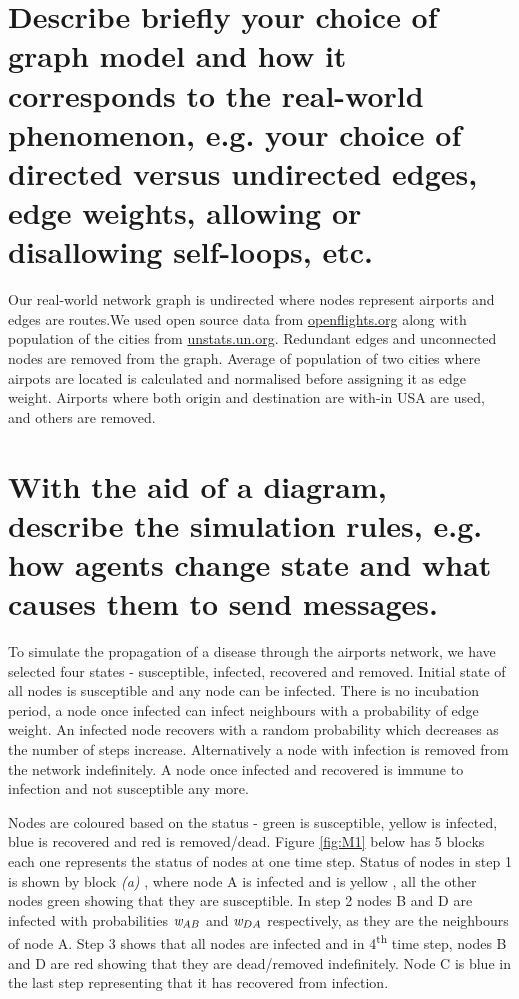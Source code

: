 \documentclass[a4paper,11pt]{article}
\begin{document}
\section{Describe briefly your choice of graph model and how it corresponds to the real-world phenomenon, e.g. your choice of directed versus undirected edges, edge weights, allowing or disallowing self-loops, etc.}

Our real-world network graph is undirected where nodes represent airports and edges are routes.We used open source data from \href{http://openflights.org}{openflights.org} along with population of the cities from \href{https://unstats.un.org/unsd/demographic/products/dyb/City_Page.htm}{unstats.un.org}. Redundant edges and unconnected nodes are removed from the graph. Average of population of two cities where airpots are located is calculated and normalised before assigning it as edge weight. Airports where both origin and destination are with-in USA are used, and others are removed.



\section{With the aid of a diagram, describe the simulation rules, e.g. how agents change state and what causes them to send messages.}



To simulate the propagation of a disease through the airports network, we have selected four states - susceptible, infected, recovered and  removed. Initial state of all nodes is susceptible and any node can be infected. There is no incubation period, a node once infected can infect neighbours with a probability of edge weight. An infected node recovers with a random probability which decreases as the number of steps increase. Alternatively a node with infection is removed from the network indefinitely. A node once infected and recovered is immune to infection and not susceptible any more.

Nodes are coloured based on the status - green is susceptible, yellow is infected, blue is recovered and red is removed/dead. Figure \ref{fig:M1} below has 5 blocks each one represents the status of nodes at one time step. Status of nodes in step 1 is shown by block \textit{(a)} , where node A is infected and is yellow , all the other nodes green showing that they are susceptible. In step 2 nodes B and D are infected with probabilities ${\emph{w} _{AB}}$  and ${\emph{w}_{DA}}$ respectively, as they are the neighbours of node A. Step 3 shows that all nodes are infected and in 4\textsuperscript{th} time step, nodes B and D are red showing that they are dead/removed indefinitely. Node C is blue in the last step representing that it has recovered from infection.
\end{document}
